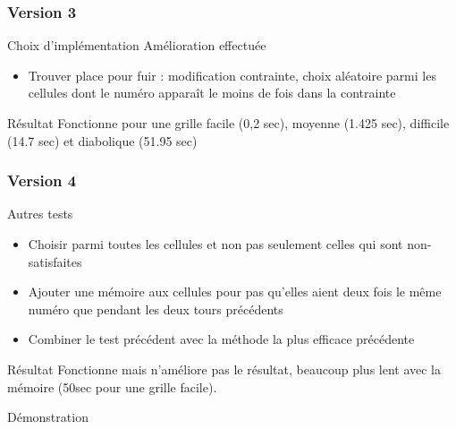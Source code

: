 \begin{frame}
    \frametitle{Version 3}
    \begin{block}{Choix d'implémentation}
    		Amélioration effectuée
    		\begin{itemize}
    			\item Trouver place pour fuir : modification contrainte, choix aléatoire parmi les cellules dont le numéro apparaît le moins de fois dans la contrainte
    		\end{itemize}
    \end{block}
    \pause
    \begin{alertblock}{Résultat}
    		Fonctionne pour une grille facile (0,2 sec), moyenne (1.425 sec), difficile (14.7 sec) et diabolique (51.95 sec)
    \end{alertblock}
\end{frame}


\begin{frame}
    \frametitle{Version 4}
    \begin{exampleblock}{Autres tests}
   		 \begin{itemize}
    				\item Choisir parmi toutes les cellules et non pas seulement celles qui sont non-satisfaites
    		 \pause
    				\item Ajouter une mémoire aux cellules pour pas qu'elles aient deux fois le même numéro que pendant les deux tours précédents 
		 \pause
				\item Combiner le test précédent avec la méthode la plus efficace précédente
		 \end{itemize}
	\end{exampleblock}
	\pause
	\begin{alertblock}{Résultat}
		Fonctionne mais n'améliore pas le résultat, beaucoup plus lent avec la mémoire (50sec pour une grille facile).
    \end{alertblock}
\end{frame}

\begin{frame}
	Démonstration
\end{frame}